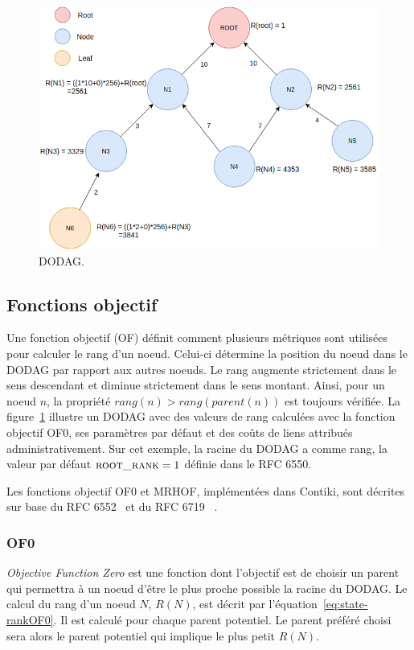     \begin{figure}[H]
        \centering
        \includegraphics[scale=0.45]{res/pictures/dodag.drawio.png}
        \caption{DODAG.}
        \label{fig:state-dodag}
    \end{figure}


\subsection*{Fonctions objectif}
Une fonction objectif (OF) définit comment plusieurs métriques sont utilisées pour calculer le rang d'un noeud. Celui-ci détermine la position du noeud dans le DODAG par rapport aux autres noeuds.
Le rang augmente strictement dans le sens descendant et diminue strictement dans le sens montant. Ainsi, pour un noeud $n$, la propriété $rang(n)>rang(parent(n))$ est toujours vérifiée. La figure~\ref{fig:state-dodag} illustre un DODAG avec des valeurs de rang calculées avec la fonction objectif OF0, ses paramètres par défaut et des coûts de liens attribués administrativement. Sur cet exemple, la racine du DODAG a comme rang, la valeur par défaut $\textsc{root\_rank}=1$ définie dans le RFC 6550.

Les fonctions objectif OF0 et MRHOF, implémentées dans Contiki, sont décrites sur base du RFC 6552~\cite{rfc:of0} et du RFC 6719 ~\cite{rfc:mrhof}.

    \subsubsection*{OF0}
        \textit{Objective Function Zero} est une fonction dont l'objectif est de choisir un parent qui permettra à un noeud d'être le plus proche possible la racine du DODAG.
        Le calcul du rang d'un noeud $N$, $R(N)$, est décrit par l'équation~\ref{eq:state-rankOF0}. Il est calculé pour chaque parent potentiel. Le parent préféré choisi sera alors le parent potentiel qui implique le plus petit $R(N)$.\par


